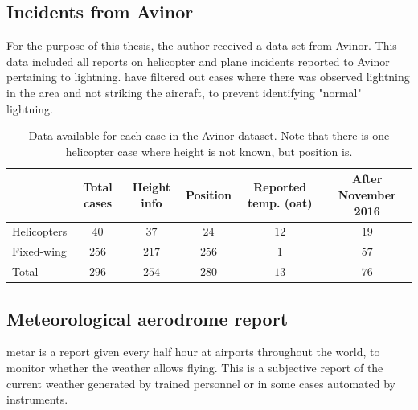 \subsection{Incidents from Avinor}\label{sec:avinordata}
For the purpose of this thesis, the author received a data set from Avinor. This data included all reports on helicopter and plane incidents reported to Avinor pertaining to lightning. have filtered out cases where there was observed lightning in the area and not striking the aircraft, to prevent identifying "normal" lightning.
\begin{table}
    \begin{tabular}{ l|c|c|c|c|c} 
    		&Total cases & Height info & Position & Reported temp. (\acrshort{oat}) & After November 2016\\
     		\hline
     		Helicopters &$40$ & $37$ & $24$ & $12$&$19$\\
     		Fixed-wing &$256$ & $217$ & $256$ & $1$&$57$\\ 
     		\hline
     		Total &$296$ &$254$ & $280$ & $13$&$76$\\ 
     		\hline
    \end{tabular}
    \caption{Data available for each case in the Avinor-dataset. Note that there is one helicopter case where height is not known, but position is. }
    \label{tab:avinor}
\end{table}

\subsection{Meteorological aerodrome report}\label{sec:metar}
\acrfull{metar} is a report given every half hour at airports throughout the world, to monitor whether the weather allows flying. This is a subjective report of the current weather generated by trained personnel or in some cases automated by instruments. 

